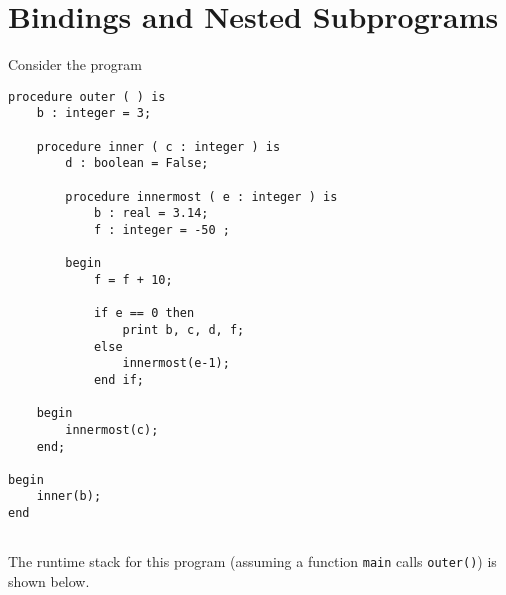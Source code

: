 \documentclass[paper=a4, fontsize=11pt]{scrartcl} %
\numberwithin{equation}{section} %
\numberwithin{figure}{section} %
\numberwithin{table}{section} %
\begin{document}
\section{Bindings and Nested Subprograms}

Consider the program 

\begin{lstlisting}
procedure outer ( ) is
	b : integer = 3;
	
	procedure inner ( c : integer ) is
		d : boolean = False;
		
		procedure innermost ( e : integer ) is
			b : real = 3.14;
			f : integer = -50 ;
	
		begin
			f = f + 10;
			
			if e == 0 then
				print b, c, d, f;
			else
				innermost(e-1);
			end if;
			
	begin
		innermost(c);
	end;

begin
	inner(b);
end
	
\end{lstlisting}

The runtime stack for this program (assuming a function \texttt{main} calls \texttt{outer()}) is shown below.


\newsavebox{\callone}

\newsavebox{\calltwo}

\newsavebox{\callthree}

\newsavebox{\callfour}
\end{document}

